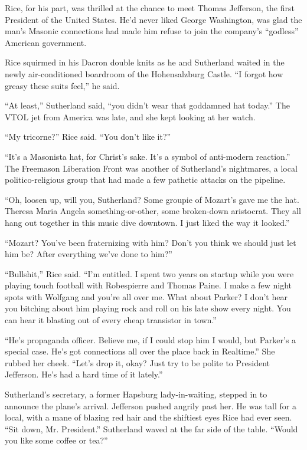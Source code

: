 Rice, for his part, was thrilled at the chance to meet Thomas Jefferson, the first President of the United States. He'd never liked George Washington, was glad the man's Masonic connections had made him refuse to join the company's ``godless'' American government.

Rice squirmed in his Dacron double knits as he and Sutherland waited in the newly air-conditioned boardroom of the Hohensalzburg Castle. ``I forgot how greasy these suits feel,'' he said.

``At least,'' Sutherland said, ``you didn't wear that goddamned hat today.'' The VTOL jet from America was late, and she kept looking at her watch.

``My tricorne?'' Rice said. ``You don't like it?''

``It's a Masonista hat, for Christ's sake. It's a symbol of anti-modern reaction.'' The Freemason Liberation Front was another of Sutherland's nightmares, a local politico-religious group that had made a few pathetic attacks on the pipeline.

``Oh, loosen up, will you, Sutherland? Some groupie of Mozart's gave me the hat. Theresa Maria Angela something-or-other, some broken-down aristocrat. They all hang out together in this music dive downtown. I just liked the way it looked.''

``Mozart? You've been fraternizing with him? Don't you think we should just let him be? After everything we've done to him?''

``Bullshit,'' Rice said. ``I'm entitled. I spent two years on startup while you were playing touch football with Robespierre and Thomas Paine. I make a few night spots with Wolfgang and you're all over me. What about Parker? I don't hear you bitching about him playing rock and roll on his late show every night. You can hear it blasting out of every cheap transistor in town.''

``He's propaganda officer. Believe me, if I could stop him I would, but Parker's a special case. He's got connections all over the place back in Realtime.'' She rubbed her cheek. ``Let's drop it, okay? Just try to be polite to President Jefferson. He's had a hard time of it lately.''

Sutherland's secretary, a former Hapsburg lady-in-waiting, stepped in to announce the plane's arrival. Jefferson pushed angrily past her. He was tall for a local, with a mane of blazing red hair and the shiftiest eyes Rice had ever seen. ``Sit down, Mr. President.'' Sutherland waved at the far side of the table. ``Would you like some coffee or tea?''


